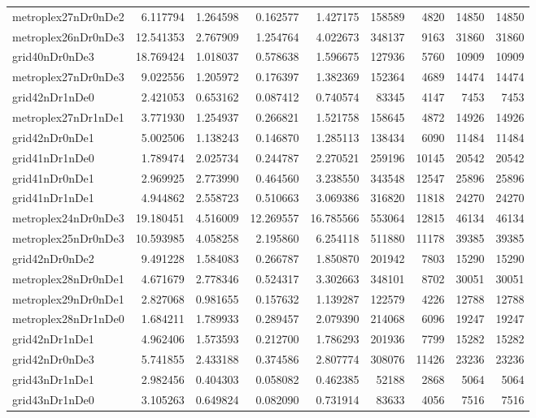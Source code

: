 \documentclass[../../../thesis.tex]{subfiles}
\begin{document}
\begin{longtable}{|l|r|r|r|r|r|r|r|r|}
metroplex27nDr0nDe2 & 6.117794 & 1.264598 & 0.162577 & 1.427175 & 158589 & 4820 & 14850 & 14850 \\
metroplex26nDr0nDe3 & 12.541353 & 2.767909 & 1.254764 & 4.022673 & 348137 & 9163 & 31860 & 31860 \\
grid40nDr0nDe3 & 18.769424 & 1.018037 & 0.578638 & 1.596675 & 127936 & 5760 & 10909 & 10909 \\
metroplex27nDr0nDe3 & 9.022556 & 1.205972 & 0.176397 & 1.382369 & 152364 & 4689 & 14474 & 14474 \\
grid42nDr1nDe0 & 2.421053 & 0.653162 & 0.087412 & 0.740574 & 83345 & 4147 & 7453 & 7453 \\
metroplex27nDr1nDe1 & 3.771930 & 1.254937 & 0.266821 & 1.521758 & 158645 & 4872 & 14926 & 14926 \\
grid42nDr0nDe1 & 5.002506 & 1.138243 & 0.146870 & 1.285113 & 138434 & 6090 & 11484 & 11484 \\
grid41nDr1nDe0 & 1.789474 & 2.025734 & 0.244787 & 2.270521 & 259196 & 10145 & 20542 & 20542 \\
grid41nDr0nDe1 & 2.969925 & 2.773990 & 0.464560 & 3.238550 & 343548 & 12547 & 25896 & 25896 \\
grid41nDr1nDe1 & 4.944862 & 2.558723 & 0.510663 & 3.069386 & 316820 & 11818 & 24270 & 24270 \\
metroplex24nDr0nDe3 & 19.180451 & 4.516009 & 12.269557 & 16.785566 & 553064 & 12815 & 46134 & 46134 \\
metroplex25nDr0nDe3 & 10.593985 & 4.058258 & 2.195860 & 6.254118 & 511880 & 11178 & 39385 & 39385 \\
grid42nDr0nDe2 & 9.491228 & 1.584083 & 0.266787 & 1.850870 & 201942 & 7803 & 15290 & 15290 \\
metroplex28nDr0nDe1 & 4.671679 & 2.778346 & 0.524317 & 3.302663 & 348101 & 8702 & 30051 & 30051 \\
metroplex29nDr0nDe1 & 2.827068 & 0.981655 & 0.157632 & 1.139287 & 122579 & 4226 & 12788 & 12788 \\
metroplex28nDr1nDe0 & 1.684211 & 1.789933 & 0.289457 & 2.079390 & 214068 & 6096 & 19247 & 19247 \\
grid42nDr1nDe1 & 4.962406 & 1.573593 & 0.212700 & 1.786293 & 201936 & 7799 & 15282 & 15282 \\
grid42nDr0nDe3 & 5.741855 & 2.433188 & 0.374586 & 2.807774 & 308076 & 11426 & 23236 & 23236 \\
grid43nDr1nDe1 & 2.982456 & 0.404303 & 0.058082 & 0.462385 & 52188 & 2868 & 5064 & 5064 \\
grid43nDr1nDe0 & 3.105263 & 0.649824 & 0.082090 & 0.731914 & 83633 & 4056 & 7516 & 7516 \\

\end{longtable}
\end{document}
